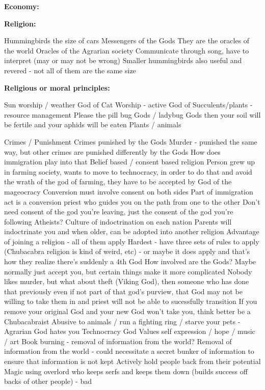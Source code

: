 \documentclass[blue]{GL2020}
\begin{document}
 
\textbf{Economy:}

\textbf{Religion:}

Hummingbirds the size of cars
Messengers of the Gods
They are the oracles of the world
Oracles of the Agrarian society 
Communicate through song, have to interpret (may or may not be wrong)
Smaller hummingbirds also useful and revered - not all of them are the same size

\textbf{Religious or moral principles:}

Sun worship / weather
God of Cat Worship - active
God of Succulents/plants - resource management
Please the pill bug Gods / ladybug Gods then your soil will be fertile and your aphids will be eaten
Plants / animals

Crimes / Punishment
Crimes punished by the Gods
Murder - punished the same way, but other crimes are punished differently by the Gods
How does immigration play into that
Belief based / consent based religion
Person grew up in farming society, wants to move to technocracy, in order to do that and avoid the wrath of the god of farming, they have to be accepted by God of the mageocracy
Conversion must involve consent on both sides
Part of immigration act is a conversion priest who guides you on the path from one to the other
Don’t need consent of the god you’re leaving, just the consent of the god you’re following
Atheists?
Culture of indoctrination on each nation
Parents will indoctrinate you and when older, can be adopted into another religion
Advantage of joining a religion - all of them apply
Hardest - have three sets of rules to apply (Chubacabra religion is kind of weird, etc) - or maybe it does apply and that’s how they realize there’s suddenly a 4th God
How involved are the Gods?
Maybe normally just accept you, but certain things make it more complicated
Nobody likes murder, but what about theft (Viking God), then someone who has done that previously even if not part of that god’s purview, that God may not be willing to take them in and priest will not be able to sucessfully transition
If you remove your original God and your new God won’t take you, think better be a Chubacabraist
Abusive to animals / run a fighting ring / starve your pets - Agrarian God hates you
Technocracy God
Values self expression / hope / music / art
Book burning - removal of information from the world?  Removal of information from the world - could necessitate a secret bunker of information to ensure that information is not kept
Actively hold people back from their potential
Magic using overlord who keeps serfs and keeps them down (builds success off backs of other people) - bad
\end{document}
